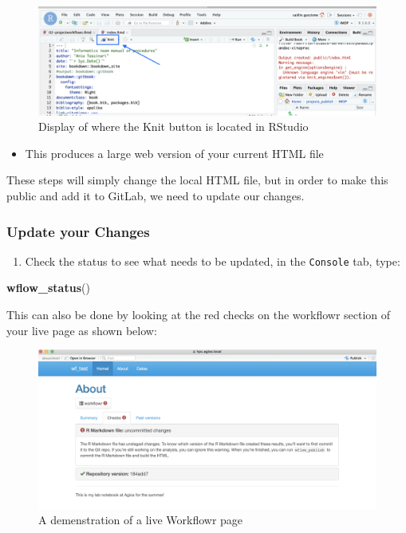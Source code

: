 \documentclass[openany]{book}
\newenvironment{Shaded}{\begin{snugshade}}{\end{snugshade}}
\newcommand{\KeywordTok}[1]{\textcolor[rgb]{0.13,0.29,0.53}{\textbf{#1}}}
\newcommand{\NormalTok}[1]{#1}
\providecommand{\tightlist}{%
  \setlength{\itemsep}{0pt}\setlength{\parskip}{0pt}}
\begin{document}
\begin{figure}

{\centering \includegraphics[width=0.8\linewidth]{images/Workflow_Photos/knit_arrow} 

}

\caption{ Display of where the Knit button is located in RStudio}\label{fig:d2}
\end{figure}

\begin{itemize}
\tightlist
\item
  This produces a large web version of your current HTML file
\end{itemize}

These steps will simply change the local HTML file, but in order to make this public and add it to GitLab, we need to update our changes.

\hypertarget{update-your-changes}{%
\subsubsection{Update your Changes}\label{update-your-changes}}

\begin{enumerate}
\def\labelenumi{\arabic{enumi}.}
\tightlist
\item
  Check the status to see what needs to be updated, in the \texttt{Console} tab, type:
\end{enumerate}

\begin{Shaded}
\begin{Highlighting}[]
\KeywordTok{wflow_status}\NormalTok{()}
\end{Highlighting}
\end{Shaded}

This can also be done by looking at the red checks on the workflowr section of your live page as shown below:

\begin{figure}

{\centering \includegraphics[width=0.9\linewidth]{images/Workflow_Photos/red_checks} 

}

\caption{A demenstration of a live Workflowr page}\label{fig:d4}
\end{figure}
\end{document}
